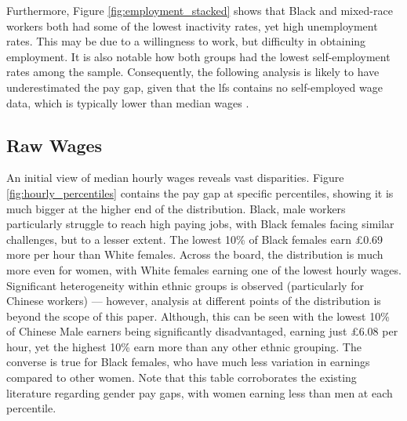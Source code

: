 \documentclass[class=article, crop=false]{standalone}
\begin{document}
Furthermore, Figure \ref{fig:employment_stacked} shows that Black and mixed-race workers both had some of the lowest inactivity rates, yet high unemployment rates. This may be due to a willingness to work, but difficulty in obtaining employment. It is also notable how both groups had the lowest self-employment rates among the sample. Consequently, the following analysis is likely to have underestimated the pay gap, given that the \acrshort{lfs} contains no self-employed wage data, which is typically lower than median wages \citep{GOVf}.



\subsection{Raw Wages}
\label{sec:Wages}
An initial view of median hourly wages reveals vast disparities. Figure \ref{fig:hourly_percentiles} contains the pay gap at specific percentiles, showing it is much bigger at the higher end of the distribution. Black, male workers particularly struggle to reach high paying jobs, with Black females facing similar challenges, but to a lesser extent. The lowest 10\% of Black females earn £0.69 more per hour than White females. Across the board, the distribution is much more even for women, with White females earning one of the lowest hourly wages. Significant heterogeneity within ethnic groups is observed (particularly for Chinese workers) --- however, analysis at different points of the distribution is beyond the scope of this paper. Although, this can be seen with the lowest 10\% of Chinese Male earners being significantly disadvantaged, earning just £6.08 per hour, yet the highest 10\% earn more than any other ethnic grouping. The converse is true for Black females, who have much less variation in earnings compared to other women. Note that this table corroborates the existing literature regarding gender pay gaps, with women earning less than men at each percentile.
\end{document}
